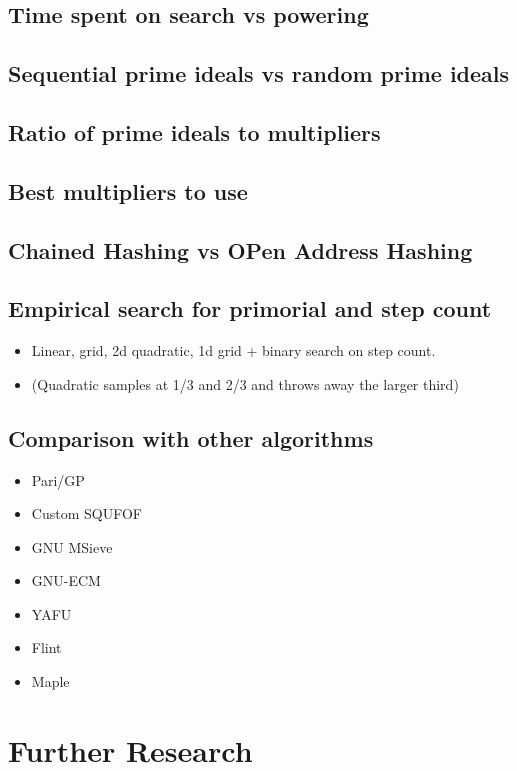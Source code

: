 \documentclass{ucalgthes1}
\theoremstyle{plain}
\theoremstyle{definition}
\begin{document}
\section{Time spent on search vs powering}

\section{Sequential prime ideals vs random prime ideals}

\section{Ratio of prime ideals to multipliers}

\section{Best multipliers to use}

\section{Chained Hashing vs OPen Address Hashing}

\section{Empirical search for primorial and step count}
\begin{itemize}
\item Linear, grid, 2d quadratic, 1d grid + binary search on step count.
\item (Quadratic samples at 1/3 and 2/3 and throws away the larger third)
\end{itemize}

\section{Comparison with other algorithms}
\begin{itemize}
\item Pari/GP
\item Custom SQUFOF
\item GNU MSieve
\item GNU-ECM
\item YAFU
\item Flint
\item Maple
\end{itemize}

\chapter{Further Research}
\end{document}
